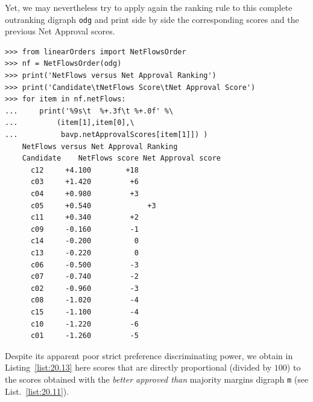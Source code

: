 Yet, we may nevertheless try to apply again the \NetFlows ranking rule to this complete outranking digraph \texttt{odg} and print side by side the corresponding \NetFlows scores and the previous Net Approval scores. 
\begin{lstlisting}[caption={Comparing the \NetFlows and the Net Approval rankings},label=list:20.13]
>>> from linearOrders import NetFlowsOrder
>>> nf = NetFlowsOrder(odg)
>>> print('NetFlows versus Net Approval Ranking')
>>> print('Candidate\tNetFlows Score\tNet Approval Score')
>>> for item in nf.netFlows:
...     print('%9s\t  %+.3f\t %+.0f' %\
...         (item[1],item[0],\
...          bavp.netApprovalScores[item[1]]) )  
    NetFlows versus Net Approval Ranking
    Candidate    NetFlows score	Net Approval score
      c12	  +4.100	    +18
      c03	  +1.420	     +6
      c04	  +0.980	     +3
      c05	  +0.540             +3
      c11	  +0.340	     +2
      c09	  -0.160	     -1
      c14	  -0.200	      0
      c13	  -0.220	      0
      c06	  -0.500	     -3
      c07	  -0.740	     -2
      c02	  -0.960	     -3
      c08	  -1.020	     -4
      c15	  -1.100	     -4
      c10	  -1.220	     -6
      c01	  -1.260	     -5
\end{lstlisting}

Despite its apparent poor strict preference discriminating power, we obtain in Listing~\vref{list:20.13} here \NetFlows scores that are directly proportional (divided by $100$) to the scores obtained with the \emph{better approved than} majority margins digraph \texttt{m} (see List.~\vref{list:20.11}).

